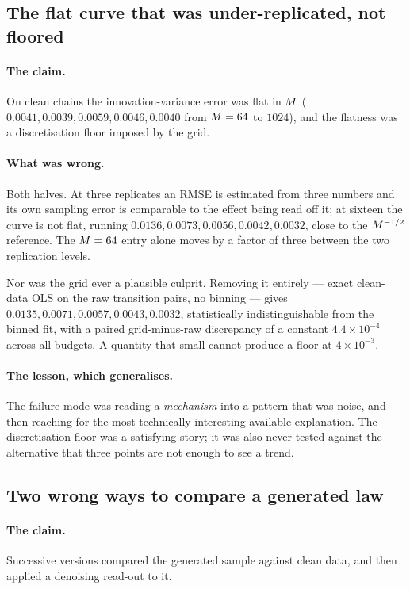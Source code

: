 \subsection{The flat curve that was under-replicated, not floored}
\label{sec:corr-flat}

\paragraph{The claim.} On clean chains the innovation-variance error was flat in $M$
($0.0041, 0.0039, 0.0059, 0.0046, 0.0040$ from $M=64$ to $1024$), and the flatness was a
discretisation floor imposed by the grid.

\paragraph{What was wrong.} Both halves. At three replicates an RMSE is estimated from three
numbers and its own sampling error is comparable to the effect being read off it; at sixteen the
curve is not flat, running $0.0136, 0.0073, 0.0056, 0.0042, 0.0032$, close to the $M^{-1/2}$
reference. The $M=64$ entry alone moves by a factor of three between the two replication
levels.

Nor was the grid ever a plausible culprit. Removing it entirely --- exact clean-data OLS on the
raw transition pairs, no binning --- gives $0.0135, 0.0071, 0.0057, 0.0043, 0.0032$, statistically
indistinguishable from the binned fit, with a paired grid-minus-raw discrepancy of a constant
$4.4\times10^{-4}$ across all budgets. A quantity that small cannot produce a floor at
$4\times10^{-3}$.

\paragraph{The lesson, which generalises.} The failure mode was reading a \emph{mechanism} into a
pattern that was noise, and then reaching for the most technically interesting available
explanation. The discretisation floor was a satisfying story; it was also never tested against
the alternative that three points are not enough to see a trend.

\subsection{Two wrong ways to compare a generated law}
\label{sec:corr-generation}

\paragraph{The claim.} Successive versions compared the generated sample against clean data, and
then applied a denoising read-out to it.

